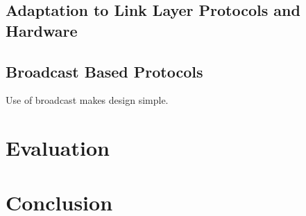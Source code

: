 \subsection{Adaptation to Link Layer Protocols and Hardware}

\subsection{Broadcast Based Protocols}

Use of broadcast makes design simple.

\section{Evaluation}


\section{Conclusion}



